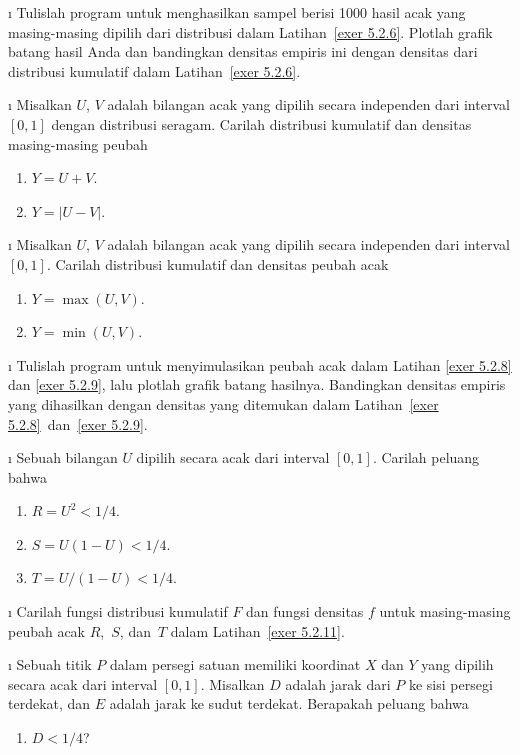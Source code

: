 \begin{LJSItem}
\i\label{5.2.7} Tulislah program untuk menghasilkan sampel berisi 1000 hasil acak
yang masing-masing dipilih dari distribusi dalam Latihan~\ref{exer 5.2.6}.  Plotlah
grafik batang hasil Anda dan bandingkan densitas empiris ini dengan densitas dari
distribusi kumulatif dalam Latihan~\ref{exer 5.2.6}.

\i\label{exer 5.2.8} Misalkan $U$, $V$ adalah bilangan acak yang dipilih secara
independen dari interval $[0,1]$ dengan distribusi seragam.  Carilah distribusi
kumulatif dan densitas masing-masing peubah
\begin{enumerate}
\item $Y = U + V$.

\item $Y = |U - V|$.
\end{enumerate}

\i\label{exer 5.2.9} Misalkan $U$, $V$ adalah bilangan acak yang dipilih secara
independen dari interval $[0,1]$.  Carilah distribusi kumulatif dan densitas peubah acak
\begin{enumerate}
\item $Y = \max(U,V)$.

\item $Y = \min(U,V)$.
\end{enumerate}

\i\label{exer 5.2.10} Tulislah program untuk menyimulasikan peubah acak dalam
Latihan \ref{exer 5.2.8} dan \ref{exer 5.2.9}, lalu plotlah grafik batang hasilnya.
Bandingkan densitas empiris yang dihasilkan dengan densitas yang ditemukan dalam
Latihan~\ref{exer 5.2.8}~dan~\ref{exer 5.2.9}.

\i\label{exer 5.2.11} Sebuah bilangan $U$ dipilih secara acak dari interval
$[0,1]$.  Carilah peluang bahwa
\begin{enumerate}
\item $R = U^2 < 1/4$.

\item $S = U(1 - U) < 1/4$.

\item $T = U/(1 - U) < 1/4$.
\end{enumerate}

\i\label{exer 5.2.12} Carilah fungsi distribusi kumulatif $F$ dan fungsi densitas $f$
untuk masing-masing peubah acak $R$,~$S$, dan~$T$ dalam Latihan~\ref{exer 5.2.11}.

\i\label{exer 5.2.13} Sebuah titik $P$ dalam persegi satuan memiliki koordinat $X$
dan $Y$ yang dipilih secara acak dari interval $[0,1]$.  Misalkan $D$ adalah jarak
dari $P$ ke sisi persegi terdekat, dan $E$ adalah jarak ke sudut terdekat.  Berapakah
peluang bahwa
\begin{enumerate}
\item $D < 1/4$?


\end{enumerate}
\end{LJSItem}
